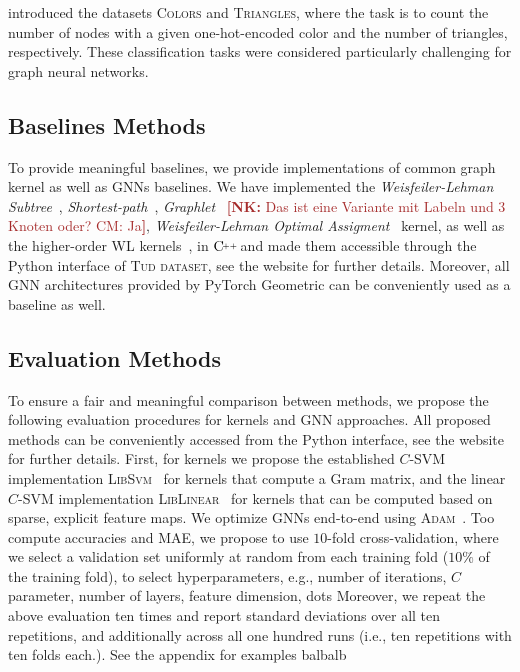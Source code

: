 \documentclass{article}
\theoremstyle{definition}
\newcommand{\new}[1]{\emph{#1}}
\newcommand{\nk}[1]{{{\textcolor{brown}{\textbf{[NK:} {#1}\textbf{]}}}}}
\newcommand{\CPP}[1][]{$\text{C\hspace{-.25ex}}^{_{_{_{++}}}}
	\ifthenelse{\equal{#1}{}}{}{\text{\hspace{-.625ex}#1}}$}
\begin{document}
\citet{Knyazev2019} introduced the datasets \textsc{Colors} and \textsc{Triangles}, where the task is to count the number of nodes with a given one-hot-encoded color and the number of triangles, respectively. These classification tasks were considered particularly challenging for graph neural networks.

\subsection{Baselines Methods}

To provide meaningful baselines, we provide implementations of common graph kernel as well as GNNs baselines. We have implemented the \new{Weisfeiler-Lehman Subtree}~\cite{She+2011}, \new{Shortest-path}~\cite{Bor+2005}, \new{Graphlet}~\cite{She+2009} \nk{Das ist eine Variante mit Labeln und 3 Knoten oder? CM: Ja}, \new{Weisfeiler-Lehman Optimal Assigment}~\cite{Kri+2016} kernel, as well as the higher-order WL kernels~\cite{Mor+2019b}, in \CPP and made them accessible through the Python interface of \textsc{Tud dataset}, see the website for further details.  Moreover, all GNN architectures provided by PyTorch Geometric can be conveniently used as a baseline as well. 

\subsection{Evaluation Methods}\label{eval}

To ensure a fair and meaningful comparison between methods, we propose the following evaluation procedures for kernels and GNN approaches. All proposed methods can be conveniently accessed from the Python interface, see the website for further details. First, for kernels we propose the established $C$-SVM implementation \textsc{LibSvm}~\cite{Cha+11} for kernels that compute a Gram matrix, and the linear $C$-SVM implementation \textsc{LibLinear}~\cite{Fan+2008} for kernels  that can be computed based on sparse, explicit feature maps. We optimize GNNs end-to-end using \textsc{Adam}~\cite{}. Too compute accuracies and MAE, we propose to use $10$-fold cross-validation, where we select a validation set uniformly at random from each training fold ($10\%$ of the training fold), to select hyperparameters, e.g., number of iterations, $C$ parameter, number of layers, feature dimension, dots Moreover, we repeat the above evaluation ten times and report standard deviations over all ten repetitions, and additionally across all one hundred runs (i.e., ten repetitions with ten folds each.). See the appendix for examples balbalb
\end{document}
